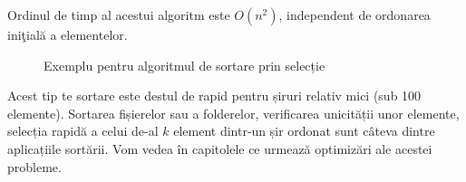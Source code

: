 Ordinul de timp al acestui algoritm este $O(n^{2})$, independent de ordonarea iniţială a elementelor. 

\begin{figure}[H] %
	\centering	
	{
	}
	\caption{Exemplu pentru algoritmul de sortare prin selecție} 
	\label{fig:sortareselectie}
\end{figure}

Acest tip te sortare este destul de rapid pentru șiruri relativ mici (sub 100 elemente). Sortarea fișierelor sau a folderelor, verificarea unicității unor elemente, selecția rapidă a celui de-al $k$ element dintr-un șir ordonat sunt câteva dintre aplicațiile sortării. Vom vedea în capitolele ce urmează optimizări ale acestei probleme.






